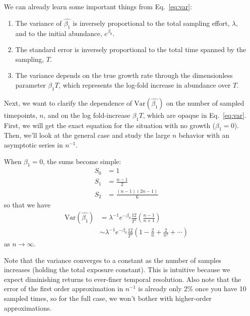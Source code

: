\documentclass[12pt, letterpaper]{article}
\begin{document}
We can already learn some important things from Eq.~\ref{eq:var}:
\begin{enumerate}
    \item The variance of $\hat{\beta_1}$ is inversely proportional to the total sampling effort, $\lambda$, and to the initial abundance, $e^{\beta_0}$.
    \item The standard error is inversely proportional to the total time spanned by the sampling, $T$.
    \item The variance depends on the true growth rate through the dimensionless parameter $\beta_1 T$, which represents the log-fold increase in abundance over $T$.
\end{enumerate}

Next, we want to clarify the dependence of $\textrm{Var}(\hat{\beta_1})$ on the number of sampled timepoints, $n$, and on the log fold-increase $\beta_1 T$, which are opaque in Eq.~\ref{eq:var}.
First, we will get the exact equation for the situation with no growth ($\beta_1 = 0$).
Then, we'll look at the general case and study the large $n$ behavior with an asymptotic series in $n^{-1}$.

When $\beta_1 = 0$, the sums become simple:
\begin{align}
    S_0 &= 1 \\
    S_1 &= \frac{n-1}{2} \\
    S_2 &= \frac{(n-1)(2n-1)}{6}
\end{align}
so that we have
\begin{align}
    \textrm{Var}(\hat{\beta_1}) &= \lambda^{-1} e^{-\beta_0} \frac{12}{T^2} \left(\frac{n-1}{n+1}\right) \\
                                &\sim \lambda^{-1} e^{-\beta_0} \frac{12}{T^2} \left(1 - \frac{2}{n} + \frac{2}{n^2} + \cdots\right)
\end{align}
as $n \to \infty$.

Note that the variance converges to a constant as the number of samples increases (holding the total exposure constant).
This is intuitive because we expect diminishing returns to ever-finer temporal resolution.
Also note that the error of the first order approximation in $n^{-1}$ is already only 2\% once you have 10 sampled times, so for the full case, we won't bother with higher-order approximations.
\end{document}
